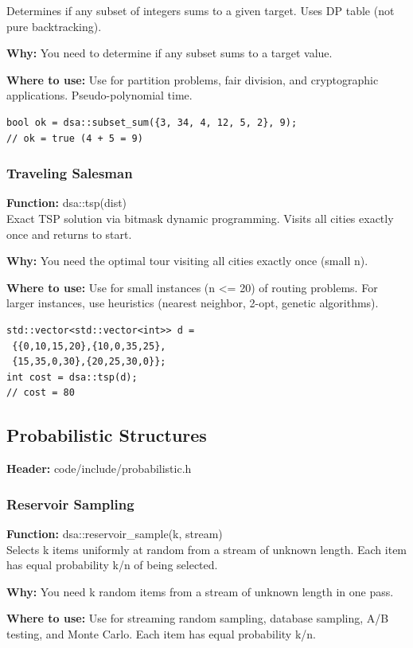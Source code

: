\documentclass[11pt]{article}
\begin{document}
Determines if any subset of integers sums to a given target. Uses DP table (not pure backtracking).

\textbf{Why:} You need to determine if any subset sums to a target value. \par \textbf{Where to use:} Use for partition problems, fair division, and cryptographic applications. Pseudo-polynomial time.

\begin{lstlisting}
bool ok = dsa::subset_sum({3, 34, 4, 12, 5, 2}, 9);
// ok = true (4 + 5 = 9)
\end{lstlisting}

\subsubsection{Traveling Salesman}
\textbf{Function:} dsa::tsp(dist)\\

Exact TSP solution via bitmask dynamic programming. Visits all cities exactly once and returns to start.

\textbf{Why:} You need the optimal tour visiting all cities exactly once (small n). \par \textbf{Where to use:} Use for small instances (n <= 20) of routing problems. For larger instances, use heuristics (nearest neighbor, 2-opt, genetic algorithms).

\begin{lstlisting}
std::vector<std::vector<int>> d =
 {{0,10,15,20},{10,0,35,25},
 {15,35,0,30},{20,25,30,0}};
int cost = dsa::tsp(d);
// cost = 80
\end{lstlisting}

\subsection{Probabilistic Structures}
\textbf{Header:} code/include/probabilistic.h

\subsubsection{Reservoir Sampling}
\textbf{Function:} dsa::reservoir\_sample(k, stream)\\

Selects k items uniformly at random from a stream of unknown length. Each item has equal probability k/n of being selected.

\textbf{Why:} You need k random items from a stream of unknown length in one pass. \par \textbf{Where to use:} Use for streaming random sampling, database sampling, A/B testing, and Monte Carlo. Each item has equal probability k/n.
\end{document}
